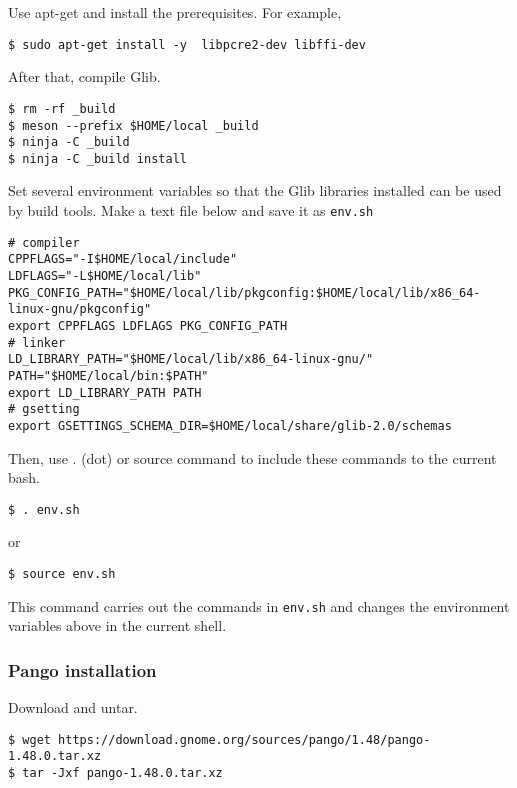 Use apt-get and install the prerequisites. For example,

\begin{lstlisting}
$ sudo apt-get install -y  libpcre2-dev libffi-dev
\end{lstlisting}

After that, compile Glib.

\begin{lstlisting}
$ rm -rf _build
$ meson --prefix $HOME/local _build
$ ninja -C _build
$ ninja -C _build install
\end{lstlisting}

Set several environment variables so that the Glib libraries installed
can be used by build tools. Make a text file below and save it as
\passthrough{\lstinline!env.sh!}

\begin{lstlisting}
# compiler
CPPFLAGS="-I$HOME/local/include"
LDFLAGS="-L$HOME/local/lib"
PKG_CONFIG_PATH="$HOME/local/lib/pkgconfig:$HOME/local/lib/x86_64-linux-gnu/pkgconfig"
export CPPFLAGS LDFLAGS PKG_CONFIG_PATH
# linker
LD_LIBRARY_PATH="$HOME/local/lib/x86_64-linux-gnu/"
PATH="$HOME/local/bin:$PATH"
export LD_LIBRARY_PATH PATH
# gsetting
export GSETTINGS_SCHEMA_DIR=$HOME/local/share/glib-2.0/schemas
\end{lstlisting}

Then, use . (dot) or source command to include these commands to the
current bash.

\begin{lstlisting}
$ . env.sh
\end{lstlisting}

or

\begin{lstlisting}
$ source env.sh
\end{lstlisting}

This command carries out the commands in
\passthrough{\lstinline!env.sh!} and changes the environment variables
above in the current shell.

\hypertarget{pango-installation}{%
\subsubsection{Pango installation}\label{pango-installation}}

Download and untar.

\begin{lstlisting}
$ wget https://download.gnome.org/sources/pango/1.48/pango-1.48.0.tar.xz
$ tar -Jxf pango-1.48.0.tar.xz
\end{lstlisting}

